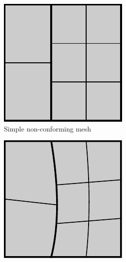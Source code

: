 \begin{figure}[ht]
	\centering
	\begin{subfigure}[t]{0.3\textwidth}
		\includegraphics[width=\textwidth]{two_patch_basic}
		\caption{Simple non-conforming mesh}\label{fig:two_patch_biharmonic_problem_basic}
	\end{subfigure}
	\hfill
	\begin{subfigure}[t]{0.3\textwidth}
		\includegraphics[width=\textwidth]{two_patch_distorted}

\end{subfigure}
\end{figure}
